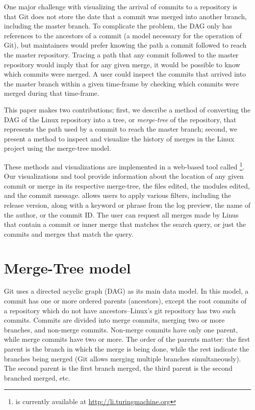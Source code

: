 \documentclass[conference, draftclsnofoot, draft]{IEEEtran}
\begin{document}
One major challenge with visualizing the arrival of commits to a repository is that
Git does not store the date that a commit was merged into another branch, including
the master branch. To complicate the problem, the DAG only has references to the
ancestors of a commit (a model necessary for the operation of Git), but maintainers
would prefer knowing the path a commit followed to reach the master repository.
Tracing a path that any commit followed to the master repository would imply that
for any given merge, it would be possible to know which commits were merged. A user
could inspect the commits that arrived into the master branch within a given
time-frame by checking which commits were merged during that time-frame.

This paper makes two contributions; first, we describe a method of converting the
DAG of the Linux repository into a tree, or \emph{merge-tree} of the repository,
that represents the path used by a commit to reach the master branch; second, we
present a method to inspect and visualize the history of merges in the Linux project
using the merge-tree model.

These methods and visualizations are implemented in a web-based tool called
\tool\footnote{\tool is currently available at \url{http://li.turingmachine.org}}.
Our visualizations and tool provide information about the location of any given
commit or merge in its respective merge-tree, the files edited, the modules edited,
and the commit message. \tool allows users to apply various filters, including the
release version, along with a keyword or phrase from the log preview, the name of
the author, or the commit ID. The user can request all merges made by Linus that
contain a commit or inner merge that matches the search query, or just the commits
and merges that match the query.

\section{Merge-Tree model}
\label{sec:mergetree}

Git uses a directed acyclic graph (DAG) as its main data model. In this model, a
commit has one or more ordered parents (ancestors), except the root commits of a
repository which do not have ancestors--Linux's git repository has two such commits.
Commits are divided into merge commits, merging two or more branches, and non-merge
commits. Non-merge commits have only one parent, while merge commits have two or
more. The order of the parents matter: the first parent is the branch in which the
merge is being done, while the rest indicate the branches being merged (Git allows
merging multiple branches simultaneously). The second parent is the first branch
merged, the third parent is the second branched merged, etc.
\end{document}
